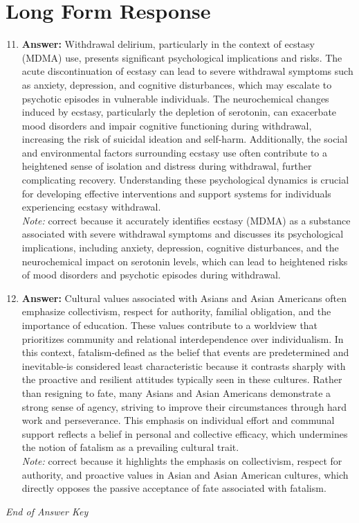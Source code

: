 \documentclass[12pt]{article}
\begin{document}
\section*{Long Form Response}
\begin{enumerate}[label=\arabic*.]
\setcounter{enumi}{10}
\item \textbf{Answer:} Withdrawal delirium, particularly in the context of ecstasy (MDMA) use, presents significant psychological implications and risks. The acute discontinuation of ecstasy can lead to severe withdrawal symptoms such as anxiety, depression, and cognitive disturbances, which may escalate to psychotic episodes in vulnerable individuals. The neurochemical changes induced by ecstasy, particularly the depletion of serotonin, can exacerbate mood disorders and impair cognitive functioning during withdrawal, increasing the risk of suicidal ideation and self-harm. Additionally, the social and environmental factors surrounding ecstasy use often contribute to a heightened sense of isolation and distress during withdrawal, further complicating recovery. Understanding these psychological dynamics is crucial for developing effective interventions and support systems for individuals experiencing ecstasy withdrawal.
\\ \textit{Note:} correct because it accurately identifies ecstasy (MDMA) as a substance associated with severe withdrawal symptoms and discusses its psychological implications, including anxiety, depression, cognitive disturbances, and the neurochemical impact on serotonin levels, which can lead to heightened risks of mood disorders and psychotic episodes during withdrawal.
\item \textbf{Answer:} Cultural values associated with Asians and Asian Americans often emphasize collectivism, respect for authority, familial obligation, and the importance of education. These values contribute to a worldview that prioritizes community and relational interdependence over individualism. In this context, fatalism-defined as the belief that events are predetermined and inevitable-is considered least characteristic because it contrasts sharply with the proactive and resilient attitudes typically seen in these cultures. Rather than resigning to fate, many Asians and Asian Americans demonstrate a strong sense of agency, striving to improve their circumstances through hard work and perseverance. This emphasis on individual effort and communal support reflects a belief in personal and collective efficacy, which undermines the notion of fatalism as a prevailing cultural trait.
\\ \textit{Note:} correct because it highlights the emphasis on collectivism, respect for authority, and proactive values in Asian and Asian American cultures, which directly opposes the passive acceptance of fate associated with fatalism.
\end{enumerate}

\vfill
\noindent\textit{End of Answer Key}
\end{document}
